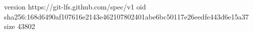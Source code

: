 version https://git-lfs.github.com/spec/v1
oid sha256:168d6490af107616e2143e462107802401abe6bc50117e26eedfe443d6e15a37
size 43802
